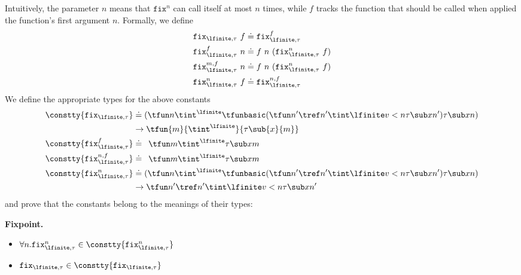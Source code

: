 %
Intuitively, 
the parameter $n$
means that $\mathtt{fix}^n$ can call itself 
at most $n$ times, 
while $f$ tracks the function that should 
be called when applied the function's first argument $n$.
%
Formally,  we define
\begin{align*}
\etfix{\tau}\ f & \doteq \etfixf{\tau}{f}{??}\\ 
\etfixf{\tau}{f}{??}\ n &\doteq
f\ n\ (\etfixn{\tau}{f}{n}\ f) \\
\etfixfn{\tau}{f}{m}\ n &\doteq
f\ n\ (\etfixn{\tau}{f}{n}\ f) \\
\etfixn{\tau}{f}{n}\ f & \doteq
    \etfixfn{\tau}{f}{n}
\end{align*}
%
We define the appropriate types for the above constants
%
\begin{align*}
\constty{\etfix{\tau}} &\doteq 
	(\decrty{\tau})\\
	&\rightarrow
	\tfun{m}{\tint^\lfinite}{\tau\sub{x}{m}}\\ 
\constty{\etfixf{\tau}{f}{n}} &\doteq 
	 \etfixfty{\tau}{f}{n}\\ 
\constty{\etfixfn{\tau}{f}{n}} &\doteq 
	 \etfixfty{\tau}{f}{n}\\ 
\constty{\etfixn{\tau}{f}{n}} &\doteq  
	(\decrty{\tau})\\&
	\rightarrow\adecrty{\tau}{n}
\\ 
\end{align*}
and prove that the constants belong to the 
meanings of their types:
\begin{theorem}\textbf{Fixpoint.}\label{thm:fixpoint}
\begin{itemize}
\item$\forall n. \etfixn{\tau}{f}{n} \in \constty{\etfixn{\tau}{f}{n}}$
\item$\etfix{\tau} \in \constty{\etfix{\tau}}$
\end{itemize}
\end{theorem}
